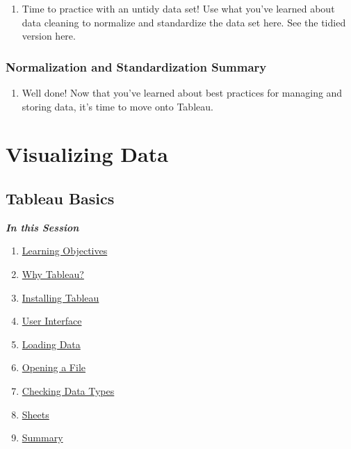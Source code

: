 \documentclass[
]{book}
\providecommand{\tightlist}{%
  \setlength{\itemsep}{0pt}\setlength{\parskip}{0pt}}
\begin{document}
\begin{enumerate}
\def\labelenumi{\arabic{enumi}.}
\tightlist
\item
  Time to practice with an untidy data set! Use what you've learned about data cleaning to normalize and standardize the data set here. See the tidied version here.
\end{enumerate}

\hypertarget{normalization-and-standardization-summary}{%
\subsection{Normalization and Standardization Summary}\label{normalization-and-standardization-summary}}

\begin{enumerate}
\def\labelenumi{\arabic{enumi}.}
\tightlist
\item
  Well done! Now that you've learned about best practices for managing and storing data, it's time to move onto Tableau.
\end{enumerate}

\hypertarget{visualizing-data}{%
\chapter{Visualizing Data}\label{visualizing-data}}

\hypertarget{tableau-basics}{%
\section{Tableau Basics}\label{tableau-basics}}

\textbf{\emph{In this Session}}

\begin{enumerate}
\def\labelenumi{\arabic{enumi}.}
\tightlist
\item
  \protect\hyperlink{tableau-basics-learning-objectives}{Learning Objectives}
\item
  \protect\hyperlink{why-tableau}{Why Tableau?}
\item
  \protect\hyperlink{installing-tableau}{Installing Tableau}
\item
  \protect\hyperlink{user-interface}{User Interface}
\item
  \protect\hyperlink{loading-data}{Loading Data}
\item
  \protect\hyperlink{opening-a-file}{Opening a File}
\item
  \protect\hyperlink{checking-data-types}{Checking Data Types}
\item
  \protect\hyperlink{sheets}{Sheets}
\item
  \protect\hyperlink{tableau-basics-summary}{Summary}
\end{enumerate}
\end{document}
